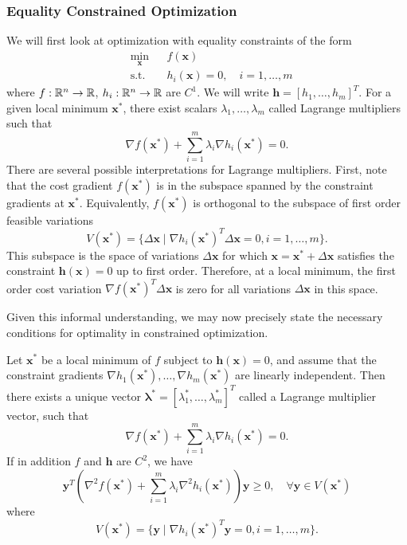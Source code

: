 \subsubsection{Equality Constrained Optimization}

We will first look at optimization with equality constraints of the form 
\begin{equation*}
\begin{aligned}
& \underset{\bm{x}}{\min}
& & f(\bm{x})\\
& \textrm{s.t.} & & h_i(\bm{x}) = 0, \quad i = 1, \ldots, m
\end{aligned}
\end{equation*}
where $f:\mathbb{R}^n \to \mathbb{R}$, $h_i:\mathbb{R}^n \to \mathbb{R}$ are $C^1$. We will write $\bm{h} = [h_1,\ldots, h_m ]^T$. For a given local minimum $\bm{x}^*$, there exist scalars $\lambda_1, \ldots, \lambda_m$ called Lagrange multipliers such that 
\begin{equation}
    \nabla f(\bm{x}^*) + \sum^m_{i=1} \lambda_i \nabla h_i(\bm{x}^*) = 0.
\end{equation}
There are several possible interpretations for Lagrange multipliers. First, note that the cost gradient $f(\bm{x}^*)$ is in the subspace spanned by the constraint gradients at $\bm{x}^*$. Equivalently, $f(\bm{x}^*)$ is orthogonal to the subspace of first order feasible variations 
\begin{equation}
    V(\bm{x}^*) = \{\Delta \bm{x} \mid \nabla h_i(\bm{x}^*)^T \Delta \bm{x} = 0, i=1,\ldots,m\}.
\end{equation}
This subspace is the space of variations $\Delta \bm{x}$ for which $\bm{x} = \bm{x}^* + \Delta \bm{x}$ satisfies the constraint $\bm{h}(\bm{x}) = 0$ up to first order. Therefore, at a local minimum, the first order cost variation $\nabla f(\bm{x}^*)^T \Delta \bm{x}$ is zero for all variations $\Delta \bm{x}$ in this space. 

Given this informal understanding, we may now precisely state the necessary conditions for optimality in constrained optimization. 

\begin{theorem}
\label{thm:eq_con_NOC}
Let $\bm{x}^*$ be a local minimum of $f$ subject to $\bm{h}(\bm{x}) = 0$, and assume that the constraint gradients $\nabla h_1(\bm{x}^*),\ldots,\nabla h_m(\bm{x}^*)$ are linearly independent. Then there exists a unique vector $\bm{\lambda}^* = [\lambda_1^*,\ldots,\lambda_m^*]^T$ called a Lagrange multiplier vector, such that
\begin{equation}
    \nabla f(\bm{x}^*) + \sum^m_{i=1} \lambda_i \nabla h_i(\bm{x}^*) = 0.
\end{equation}
If in addition $f$ and $\bm{h}$ are $C^2$, we have 
\begin{equation}
    \bm{y}^T (\nabla^2 f(\bm{x}^*) + \sum^m_{i=1} \lambda_i \nabla^2 h_i(\bm{x}^*)) \bm{y} \geq 0, \quad \forall \bm{y} \in V(\bm{x}^*) 
\end{equation}
where
\begin{equation}
    V(\bm{x}^*) = \{\bm{y} \mid \nabla h_i(\bm{x}^*)^T \bm{y} = 0, i=1,\ldots,m\}.
\end{equation}
\end{theorem}

